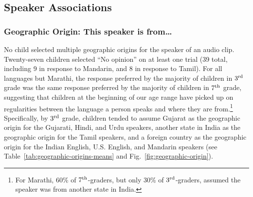 \documentclass{foushee-adapted-preprint}
\begin{document}
\subsection*{Speaker Associations}
\subsubsection*{Geographic Origin: This speaker is from\ldots} 
No child selected multiple geographic origins for the speaker of an audio clip. Twenty-seven children selected ``No opinion'' on at least one trial (39 total, including 9 in response to Mandarin, and 8 in response to Tamil). 
For all languages but Marathi, the response preferred by the majority of children in $3^{\textnormal{rd}}$ grade was the same response preferred by the majority of children in $7^{\textnormal{th}}$ grade, suggesting that children at the beginning of our age range have picked up on regularities between the language a person speaks and where they are from.\footnote{For Marathi, 60\% of $7^{\textnormal{th}}$-graders, but only 30\% of $3^{\textnormal{rd}}$-graders, assumed the speaker was from another state in India.}
Specifically, by $3^{\textnormal{rd}}$ grade, children tended to assume Gujarat as the geographic origin for the Gujarati, Hindi, and Urdu speakers, another state in India as the geographic origin for the Tamil speakers, and a foreign country as the geographic origin for the Indian English, U.S. English, and Mandarin speakers (see Table~\ref{tab:geographic-origins-means} and Fig.~\ref{fig:geographic-origin}). 
\end{document}
